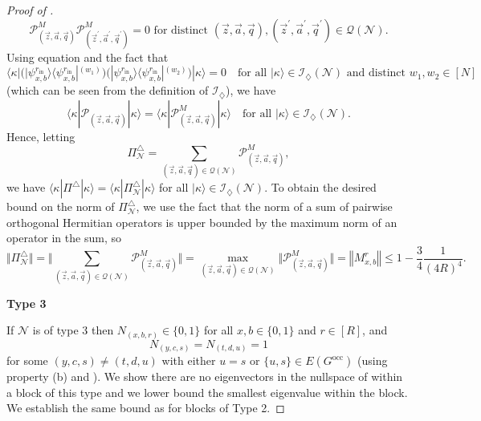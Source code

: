 \documentclass[../thesis-main/thesis-main]{subfiles}
\begin{document}
\begin{proof}[Proof of \protect{}]
\[
\mathcal{P}_{(\vec{z},\vec{a},\vec{q})}^{M}\mathcal{P}_{(\vec{z}^{\prime},\vec{a}^{\prime},\vec{q}^{\prime})}^{M}=0\text{ for distinct }(\vec{z},\vec{a},\vec{q}),(\vec{z}^{\prime},\vec{a}^{\prime},\vec{q}^{\prime})\in\mathcal{Q}(\mathcal{N}).
\]
Using equation  and the fact that
\[
\langle\kappa|\Big(|\psi_{x,b}^{r_{\text{in}}}\rangle\langle\psi_{x,b}^{r_{\text{in}}}|^{(w_{1})}\Big)\Big(|\psi_{x,b}^{r_{\text{in}}}\rangle\langle\psi_{x,b}^{r_{\text{in}}}|^{(w_{2})}\Big)|\kappa\rangle=0\quad\text{for all }|\kappa\rangle\in\mathcal{I}_{\diamondsuit}(\mathcal{N})\text{ and distinct }w_{1},w_{2}\in[N]
\]
(which can be seen from the definition of $\mathcal{I}_\diamondsuit$), we have 
\[
\langle\kappa|\mathcal{P}_{(\vec{z},\vec{a},\vec{q})}|\kappa\rangle=\langle\kappa|\mathcal{P}_{(\vec{z},\vec{a},\vec{q})}^{M}|\kappa\rangle\quad\text{for all }|\kappa\rangle\in\mathcal{I}_{\diamondsuit}(\mathcal{N}).
\]
Hence, letting 
\begin{equation}
\Pi_{\mathcal{N}}^{\triangle}=\sum_{(\vec{z},\vec{a},\vec{q})\in\mathcal{Q}(\mathcal{N})}\mathcal{P}_{(\vec{z},\vec{a},\vec{q})}^{M},\label{eq:pi_triangle_N}
\end{equation}
we have $\langle\kappa|\Pi^{\triangle}|\kappa\rangle=\langle\kappa|\Pi_{\mathcal{N}}^{\triangle}|\kappa\rangle$ for all $|\kappa\rangle\in\mathcal{I}_{\diamondsuit}(\mathcal{N})$. To obtain the desired bound  on the norm of $\Pi_{\mathcal{N}}^{\triangle}$, we use the fact that the norm of a sum of pairwise orthogonal Hermitian operators is upper bounded by the maximum norm of an operator in the sum, so
\begin{equation}
\big\Vert \Pi_{\mathcal{N}}^{\triangle}\big\Vert 
=\Bigg\Vert \sum_{(\vec{z},\vec{a},\vec{q})\in\mathcal{Q}(\mathcal{N})}\mathcal{P}_{(\vec{z},\vec{a},\vec{q})}^{M}\Bigg\Vert 
=\max_{(\vec{z},\vec{a},\vec{q})\in\mathcal{Q}(\mathcal{N})}\big\Vert \mathcal{P}_{(\vec{z},\vec{a},\vec{q})}^{M}\big\Vert 
=\left\Vert M_{x,b}^{r}\right\Vert \leq1-\frac{3}{4}\frac{1}{\left(4R\right)^{4}}.
\label{eq:bound_on_norm_pi_n_triangle}
\end{equation}

\medskip

\noindent \textbf{Type 3}

\smallskip

\noindent If $\mathcal{N}$ is of type 3 then $N_{(x,b,r)}\in\{0,1\}$
for all $x,b\in\{0,1\}$ and $r\in[R]$, and 
\[
N_{(y,c,s)}=N_{(t,d,u)}=1
\]
for some $(y,c,s)\neq(t,d,u)$ with either $u=s$ or $\{u,s\}\in E(G^{\text{occ}})$ (using property (b) and ). We show there are no eigenvectors in the nullspace of  within a block of this type and we lower bound the smallest eigenvalue within the block. We establish the same bound  as for blocks of Type 2.


\end{proof}
\end{document}
